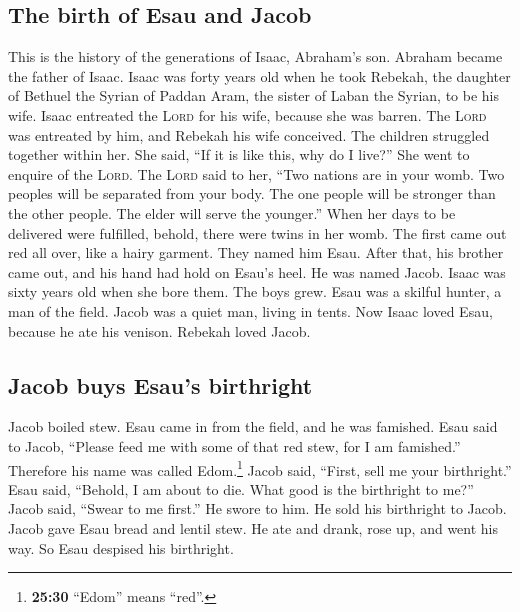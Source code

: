 \hypertarget{the-birth-of-esau-and-jacob}{%
\subsection{The birth of Esau and
Jacob}\label{the-birth-of-esau-and-jacob}}

 This is the history of the generations of Isaac,
Abraham's son. Abraham became the father of Isaac.  Isaac
was forty years old when he took Rebekah, the daughter of Bethuel the
Syrian of Paddan Aram, the sister of Laban the Syrian, to be his wife.
 Isaac entreated the \textsc{Lord} for his wife, because
she was barren. The \textsc{Lord} was entreated by him, and Rebekah his
wife conceived.  The children struggled together within
her. She said, ``If it is like this, why do I live?'' She went to
enquire of the \textsc{Lord}.  The \textsc{Lord} said to
her, ``Two nations are in your womb. Two peoples will be separated from
your body. The one people will be stronger than the other people. The
elder will serve the younger.''  When her days to be
delivered were fulfilled, behold, there were twins in her womb.
 The first came out red all over, like a hairy garment.
They named him Esau.  After that, his brother came out,
and his hand had hold on Esau's heel. He was named Jacob. Isaac was
sixty years old when she bore them.  The boys grew. Esau
was a skilful hunter, a man of the field. Jacob was a quiet man, living
in tents.  Now Isaac loved Esau, because he ate his
venison. Rebekah loved Jacob.

\hypertarget{jacob-buys-esaus-birthright}{%
\subsection{Jacob buys Esau's
birthright}\label{jacob-buys-esaus-birthright}}

 Jacob boiled stew. Esau came in from the field, and he
was famished.  Esau said to Jacob, ``Please feed me with
some of that red stew, for I am famished.'' Therefore his name was
called Edom.\footnote{\textbf{25:30} ``Edom'' means ``red''.}
 Jacob said, ``First, sell me your birthright.''
 Esau said, ``Behold, I am about to die. What good is the
birthright to me?''  Jacob said, ``Swear to me first.''
He swore to him. He sold his birthright to Jacob.  Jacob
gave Esau bread and lentil stew. He ate and drank, rose up, and went his
way. So Esau despised his birthright.

